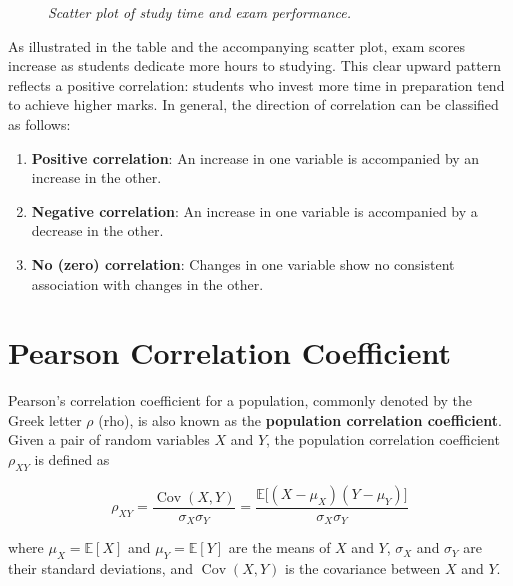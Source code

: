 \documentclass[twoside]{book}
\begin{document}
\begin{figure}[h!]
	\centering
	\caption{\textit{Scatter plot of study time and exam performance.}}
\end{figure}


As illustrated in the table and the accompanying scatter plot, exam scores increase as students dedicate more hours to studying. This clear upward pattern reflects a positive correlation: students who invest more time in preparation tend to achieve higher marks.  In general, the direction of correlation can be classified as follows:

\begin{enumerate}
	\item \textbf{Positive correlation}: An increase in one variable is accompanied by an increase in the other.
	\item \textbf{Negative correlation}: An increase in one variable is accompanied by a decrease in the other.
	\item \textbf{No (zero) correlation}: Changes in one variable show no consistent association with changes in the other.
\end{enumerate}


\section{Pearson Correlation Coefficient}

Pearson's correlation coefficient for a population, commonly denoted by the Greek letter \(\rho\) (rho), is also known as the \textbf{population correlation coefficient}. Given a pair of random variables \(X\) and \(Y\), the population correlation coefficient \(\rho_{XY}\) is defined as

\begin{textbox}
\[
\rho_{XY} = \frac{\operatorname{Cov}(X,Y)}{\sigma_X \sigma_Y} = \frac{\mathbb{E}\big[(X - \mu_X)(Y - \mu_Y)\big]}{\sigma_X \sigma_Y}
\]
\end{textbox}
where \(\mu_X = \mathbb{E}[X]\) and \(\mu_Y = \mathbb{E}[Y]\) are the means of \(X\) and \(Y\), \(\sigma_X\) and \(\sigma_Y\) are their standard deviations, and \(\operatorname{Cov}(X,Y)\) is the covariance between \(X\) and \(Y\).
\end{document}
